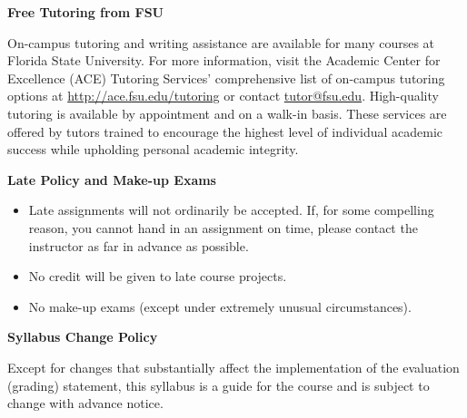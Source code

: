 \vspace{\baselineskip}

\textbf{Free Tutoring from FSU}

On-campus tutoring and writing assistance are available for many courses at Florida State University. For more information, visit the Academic Center for Excellence (ACE) Tutoring Services’ comprehensive list of on-campus tutoring options at \url{http://ace.fsu.edu/tutoring} or contact \href{mailto:tutor@fsu.edu}{tutor@fsu.edu}. High-quality tutoring is available by appointment and on a walk-in basis. These services are offered by tutors trained to encourage the highest level of individual academic success while upholding personal academic integrity.

\vspace{\baselineskip}

\textbf{Late Policy and Make-up Exams}
\begin{itemize}
    \item Late assignments will not ordinarily be accepted. If, for some compelling reason, you cannot hand in an assignment on time, please contact the instructor as far in advance as possible.
    \item No credit will be given to late course projects.
    \item No make-up exams (except under extremely unusual circumstances).
\end{itemize}

\vspace{\baselineskip}

\textbf{Syllabus Change Policy}

Except for changes that substantially affect the implementation of the evaluation (grading) statement, this syllabus is a guide for the course and is subject to change with advance notice.
